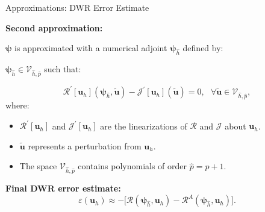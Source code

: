 \documentclass{beamer}
\newcounter{sectionframecount}
\begin{document}
\begin{frame}[t]{Approximations: DWR Error Estimate}
  \vspace{-10pt}


  \vspace{5pt}
  \textbf{Second approximation:}

  \vspace{10pt}
  $\boldsymbol{\psi}$ is approximated with a numerical adjoint $\boldsymbol{\psi}_{\hat{h}}$ defined by\footnotemark:

  $\boldsymbol{\psi}_{\hat{h}} \in \mathcal{V}_{\hat{h},\hat{p}}$ such that:

\begin{equation}
  \mathcal{R}^\prime[\boldsymbol{u}_h](\boldsymbol{\psi}_{\hat{h}},\tilde{\boldsymbol{u}}) - \mathcal{J}^\prime[\boldsymbol{u}_h](\tilde{\boldsymbol{u}}) = 0,~~~\forall \tilde{\boldsymbol{u}} \in \mathcal{V}_{\hat{h},\hat{p}},
\end{equation}
where:

\begin{itemize}
  \item $\mathcal{R}^\prime[\boldsymbol{u}_h]$ and $\mathcal{J}^\prime[\boldsymbol{u}_h]$ are the linearizations of $\mathcal{R}$ and $\mathcal{J}$ about $\boldsymbol{u}_h$.
  \item $\tilde{\boldsymbol{u}}$ represents a perturbation from $\boldsymbol{u}_h$.
  \item The space $\mathcal{V}_{\hat{h},\hat{p}}$ contains polynomials of order $\hat{p}=p+1$.
\end{itemize}
\vspace{10pt}
\textbf{Final DWR error estimate:}
\begin{equation}
  \varepsilon(\boldsymbol{u}_h) \approx -\Big[\mathcal{R}(\boldsymbol{\psi}_{\hat{h}},\boldsymbol{u}_h) - \mathcal{R}^A(\boldsymbol{\psi}_{\hat{h}},\boldsymbol{u}_h)\Big].
\end{equation}


\end{frame}

\end{document}
